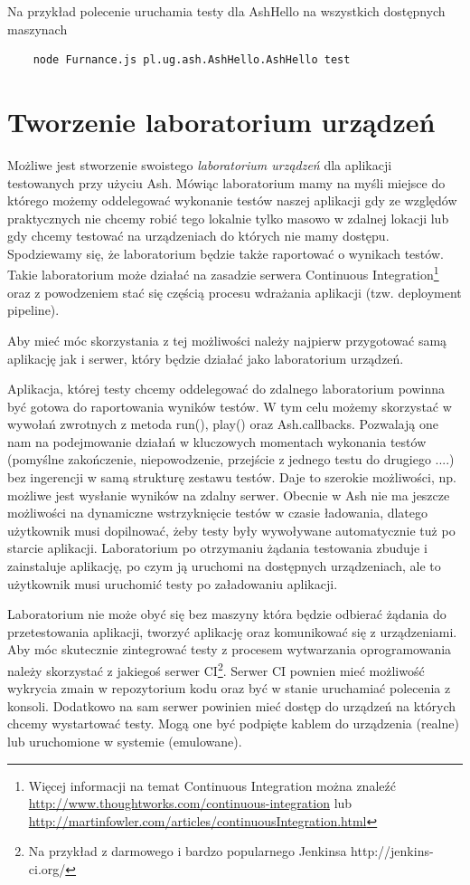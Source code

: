 \documentclass[brudnopis]{xmgr}
\begin{document}
Na przykład polecenie uruchamia testy dla AshHello na wszystkich dostępnych maszynach 

\begin{lstlisting}
	node Furnance.js pl.ug.ash.AshHello.AshHello test
\end{lstlisting}

\section{Tworzenie laboratorium urządzeń}

Możliwe jest stworzenie swoistego \textit{laboratorium urządzeń} dla aplikacji testowanych przy użyciu Ash. Mówiąc laboratorium mamy na myśli miejsce do którego możemy oddelegować wykonanie testów naszej aplikacji gdy ze względów praktycznych nie chcemy robić tego lokalnie tylko masowo w zdalnej lokacji lub gdy chcemy testować na urządzeniach do których nie mamy dostępu. Spodziewamy się, że laboratorium będzie także raportować o wynikach testów. Takie laboratorium może działać na zasadzie serwera Continuous Integration\footnote{ Więcej informacji na temat Continuous Integration można znaleźć \url{http://www.thoughtworks.com/continuous-integration} lub \url{http://martinfowler.com/articles/continuousIntegration.html} } oraz z powodzeniem stać się częścią procesu wdrażania aplikacji (tzw. deployment pipeline).

Aby mieć móc skorzystania z tej możliwości należy najpierw przygotować samą aplikację jak i serwer, który będzie działać jako laboratorium urządzeń. 

Aplikacja, której testy chcemy oddelegować do zdalnego laboratorium powinna być gotowa do raportowania wyników testów. W tym celu możemy skorzystać w wywołań zwrotnych z metoda run(), play() oraz Ash.callbacks. Pozwalają one nam na podejmowanie działań w kluczowych momentach wykonania testów (pomyślne zakończenie, niepowodzenie, przejście z jednego testu do drugiego ....) bez ingerencji w samą strukturę zestawu testów. Daje to szerokie możliwości, np. możliwe jest wysłanie wyników na zdalny serwer. Obecnie w Ash nie ma jeszcze możliwości na dynamiczne wstrzyknięcie testów w czasie ładowania, dlatego użytkownik musi dopilnować, żeby testy były wywoływane automatycznie tuż po starcie aplikacji. Laboratorium po otrzymaniu żądania testowania zbuduje i zainstaluje aplikację, po czym ją uruchomi na dostępnych urządzeniach, ale to użytkownik musi uruchomić testy po załadowaniu aplikacji.

Laboratorium nie może obyć się bez maszyny która będzie odbierać żądania do przetestowania aplikacji, tworzyć aplikację oraz komunikować się z urządzeniami. Aby móc skutecznie zintegrować testy z procesem wytwarzania oprogramowania należy skorzystać z jakiegoś serwer CI\footnote{ Na przykład z darmowego i bardzo popularnego Jenkinsa http://jenkins-ci.org/}. Serwer CI pownien mieć możliwość wykrycia zmain w repozytorium kodu oraz być w stanie uruchamiać polecenia z konsoli. Dodatkowo na sam serwer powinien mieć dostęp do urządzeń na których chcemy wystartować testy. Mogą one być podpięte kablem do urządzenia (realne) lub uruchomione w systemie (emulowane). 
\end{document}
